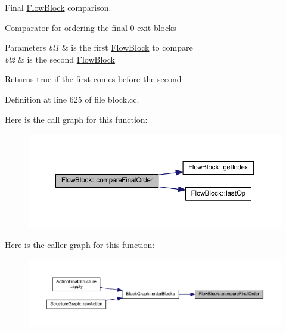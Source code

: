 Final \mbox{\hyperlink{class_flow_block}{Flow\+Block}} comparison. 

Comparator for ordering the final 0-\/exit blocks 
\begin{DoxyParams}{Parameters}
{\em bl1} & is the first \mbox{\hyperlink{class_flow_block}{Flow\+Block}} to compare \\
\hline
{\em bl2} & is the second \mbox{\hyperlink{class_flow_block}{Flow\+Block}} \\
\hline
\end{DoxyParams}
\begin{DoxyReturn}{Returns}
true if the first comes before the second 
\end{DoxyReturn}


Definition at line 625 of file block.\+cc.

Here is the call graph for this function\+:
\nopagebreak
\begin{figure}[H]
\begin{center}
\leavevmode
\includegraphics[width=350pt]{class_flow_block_a743cb628028fcd227b072bb14587f08e_cgraph}
\end{center}
\end{figure}
Here is the caller graph for this function\+:
\nopagebreak
\begin{figure}[H]
\begin{center}
\leavevmode
\includegraphics[width=350pt]{class_flow_block_a743cb628028fcd227b072bb14587f08e_icgraph}
\end{center}
\end{figure}
\mbox{\label{class_flow_block_a9baddec2635c95a5ac9019d6b21d3eab}} 
